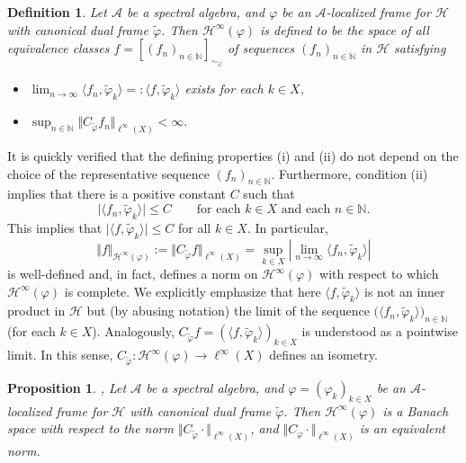 \documentclass{amsart}
\newtheorem{def.}[theorem]{Definition}
\newtheorem{prop.}[theorem]{Proposition}
\def\Hil{\mathcal{H}}
\newcommand{\N}[0]{{\mathbb{N}}}
\newcommand{\A}[0]{{\mathcal{A}}}
\begin{document}
\begin{def.}\label{Hwinftydef}\cite{xxlgro14,koeba24}
Let $\A$ be a spectral algebra, and $\varphi$ be an $\A$-localized frame for $\Hil$ with canonical dual frame $\widetilde{\varphi}$. Then $\Hil^{\infty}(\varphi)$ is defined to be the space of all equivalence classes $f=[ ( f_n )_{n\in\N}]_{\sim_{\varphi}}$ of sequences $( f_n  )_{n\in\N}$ in $\Hil$ satisfying 
\begin{itemize}
    \item[(i)] $\lim_{n\rightarrow \infty} \langle f_n , \widetilde{\varphi}_k\rangle =: \langle f , \widetilde{\varphi}_k\rangle$ exists for each $k\in X$, 
    \item[(ii)] $\sup_{n\in \mathbb{N}} \Vert C_{\widetilde{\varphi}}f_n \Vert_{\ell^{\infty}(X)} < \infty .$
\end{itemize}
\end{def.}
It is quickly verified that the defining properties (i) and (ii) do not depend on the choice of the representative sequence $(f_n)_{n\in \mathbb{N}}$. Furthermore, condition (ii) implies that
there is a positive constant $C$ such that 
\begin{equation}\label{Cineq}
\vert \langle f_n, \widetilde{\varphi}_k\rangle \vert \leq C \qquad \text{for each } k\in X \text { and each } n\in \mathbb{N}.
\end{equation}
 This implies that $\vert \langle f , \widetilde{\varphi}_k\rangle \vert \leq C$ for all $k\in X$. In particular, 
\begin{equation}\label{Hpinftynorm}
\Vert f \Vert_{\Hil^{\infty}(\varphi)} := \Vert C_{\widetilde{\varphi}} f \Vert_{\ell^{\infty}(X)} = \sup_{k\in X} \left\vert \lim_{n\rightarrow \infty} \langle f_n , \widetilde{\varphi}_k\rangle \right\vert
\end{equation}
is well-defined and, in fact, defines a norm on $\Hil^{\infty}(\varphi)$ with respect to which $\Hil^{\infty}(\varphi)$ is complete. We explicitly emphasize that here $\langle f , \widetilde{\varphi}_k\rangle$ is not an inner product in $\Hil$ but (by abusing notation) the limit of the sequence $\big( \langle f_n,\widetilde{\varphi}_k \rangle  \big)_{n\in\N}$ (for each $k\in X$). Analogously, $C_{\widetilde{\varphi}} f = (\langle f,\widetilde{\varphi}_k\rangle)_{k\in X}$ is understood as a pointwise limit. In this sense, $C_{\widetilde{\varphi}}:\Hil^{\infty}(\varphi)\to \ell^{\infty}(X)$ defines an isometry.

\begin{prop.}\label{Hinftynormequ}
\cite[Theorem~3.8]{forngroech1}, \cite[Corollary~3.27]{koeba24} Let $\A$ be a spectral algebra, and $\varphi =(\varphi_k)_{k\in X}$ be an $\A$-localized frame for $\Hil$ with canonical dual frame $\widetilde{\varphi}$. Then $\Hil^{\infty}(\varphi)$ is a Banach space with respect to the norm $\Vert C_{\widetilde{\varphi}} \cdot \Vert_{\ell^{\infty}(X)}$, and $\Vert C_{\varphi} \cdot \Vert_{\ell^{\infty}(X)}$ is an equivalent norm.
\end{prop.}
\end{document}
